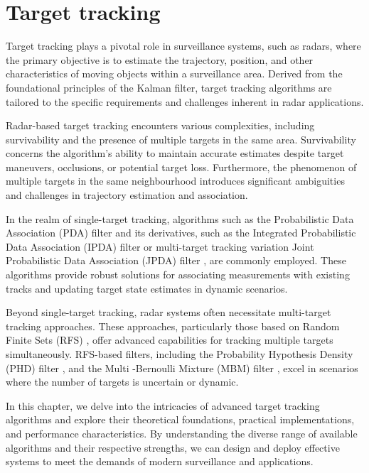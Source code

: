 
\chapter{Target tracking}
Target tracking plays a pivotal role in surveillance systems, such as radars, where the primary objective is to 
estimate the 
trajectory,
position, and other
characteristics of moving objects within a surveillance area. Derived from the foundational principles of the Kalman filter, target tracking algorithms are tailored to the specific requirements and challenges inherent in radar applications.

Radar-based target tracking encounters various complexities, including survivability and the presence of
multiple targets in the same area. Survivability concerns the algorithm's ability to maintain
accurate estimates despite target maneuvers, occlusions, or potential target loss. Furthermore, the phenomenon of
multiple targets in the same neighbourhood introduces significant ambiguities and challenges in trajectory estimation
and
association.

In the realm of single-target tracking, algorithms such as the Probabilistic Data Association (PDA) filter \cite{BarShalomPDA} and
its
derivatives, such as the Integrated
Probabilistic Data Association (IPDA) filter \cite{brekke} or multi-target tracking variation Joint Probabilistic Data 
Association
(JPDA)
filter \cite{brekke}, are commonly
employed. These algorithms provide robust solutions for associating measurements with existing tracks and updating target state estimates in dynamic scenarios.

Beyond single-target tracking, radar systems often necessitate multi-target tracking approaches. These approaches,
particularly those based on Random Finite Sets (RFS) \cite{mahler}, offer advanced capabilities for tracking multiple targets
simultaneously. RFS-based filters, including the Probability Hypothesis Density (PHD) filter \cite{VoMaPHD2006}, and the Multi
-Bernoulli Mixture (MBM) filter \cite{GarciaPMBM2018}, excel in scenarios where the number of targets is uncertain or dynamic.

In this chapter, we delve into the intricacies of advanced target tracking algorithms and explore their theoretical
foundations, practical implementations, and performance characteristics. By understanding the diverse range of available algorithms and their respective strengths, we can design and deploy effective systems to meet the demands of modern surveillance and applications.

